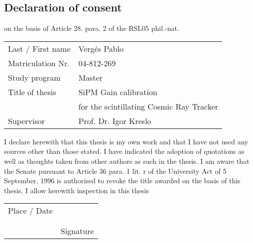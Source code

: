 \documentclass[a4paper,twoside]{tufte-handout}
\begin{document}

\clearpage
\newpage


\clearpage
\pagebreak


\clearpage
\pagebreak


\clearpage
\newpage


\clearpage
\newpage

%

{}
\printglossary[type=\acronymtype]
\newpage



\newpage

\begin{appendices}
  \section*{Declaration of consent}

  on the basis of Article 28. para. 2 of the RSL05 phil.-nat.

  \vspace*{12em}
  \begin{table}
  \centering
  \begin{tabular}{ l l }
    \toprule
    Last / First name  & Verg\'es Pablo \\
    Matriculation Nr.  & 04-812-269 \\
    Study program      & Master \\
    Title of thesis    & SiPM Gain calibration \\
                       & for the scintillating Cosmic Ray Tracker \\
    Supervisor         & Prof. Dr. Igor Kreslo \\

    \bottomrule
  \end{tabular}
  \end{table}
  \vspace*{12em}
  I declare herewith that this thesis is my own work and that I have not used any sources other than those stated.
  I have indicated the adoption of quotations as well as thoughts taken from other authors as such in the thesis.
  I am aware that the Senate pursuant to Article 36 para. 1 lit. r of the University Act of 5 September, 1996 is authorised to revoke the title awarded on the basis of this thesis.
  I allow herewith inspection in this thesis

  \vspace*{12em}
  \begin{table}
  \begin{tabular}{ l l }
    Place / Date  & \hspace*{20em} \\
    \\
    \\
    \hspace*{20em} & Signature \\
  \end{tabular}
  \end{table}
\end{appendices}
\end{document}
